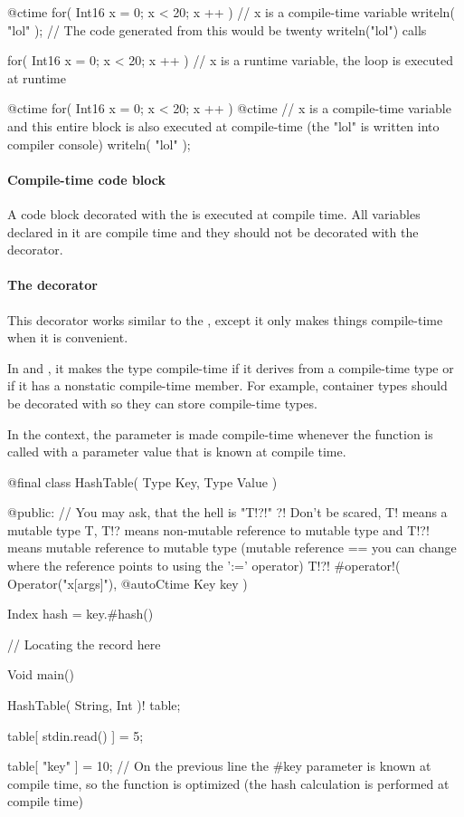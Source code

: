 \begin{code}
@ctime for( Int16 x = 0; x < 20; x ++ ) {
	// x is a compile-time variable
	writeln( "lol" );
	// The code generated from this would be twenty writeln("lol") calls
}

for( Int16 x = 0; x < 20; x ++ ) {
	// x is a runtime variable, the loop is executed at runtime	
}

@ctime for( Int16 x = 0; x < 20; x ++ ) @ctime {
	// x is a compile-time variable and this entire block is also executed at compile-time (the "lol" is written into compiler console)
	writeln( "lol" );
}

\end{code}

\paragraph{Compile-time code block} A code block decorated with the  is executed at compile time. All variables declared in it are compile time and they should not be decorated with the  decorator.

\paragraph{The  decorator} \label{decorator:autoCtime} This decorator works similar to the , except it only makes things compile-time when it is convenient.

In  and , it makes the type compile-time if it derives from a compile-time type or if it has a nonstatic compile-time member. For example, container types should be decorated with  so they can store compile-time types.

In the  context, the parameter is made compile-time whenever the function is called with a parameter value that is known at compile time.
\begin{code}
@final class HashTable( Type Key, Type Value ) {

@public:
	// You may ask, that the hell is "T!?!" ?! Don't be scared, T! means a mutable type T, T!? means non-mutable reference to mutable type and T!?! means mutable reference to mutable type (mutable reference == you can change where the reference points to using the ':=' operator)
	T!?! #operator!( Operator("x[args]"), @autoCtime Key key ) {
		Index hash = key.#hash() %
		
		// Locating the record here 
	}
	
}

Void main() {
	HashTable( String, Int )! table;
	
	table[ stdin.read() ] = 5;
	
	table[ "key" ] = 10;
	// On the previous line the #key parameter is known at compile time, so the function is optimized (the hash calculation is performed at compile time)
}
\end{code}

